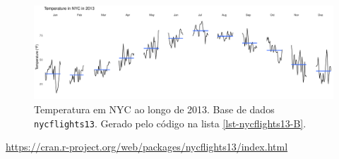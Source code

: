 \begin{frame}
\begin{figure}[h]
 \centering
  \includegraphics[width=\textwidth,height=0.7\textheight,keepaspectratio]{figures/nycflights13-B.pdf}
 \caption{Temperatura em NYC ao longo de 2013. Base de dados \texttt{nycflights13}. Gerado pelo código na lista \ref{lst-nycflights13-B}.}
 \label{fig-nycflights13-B}
\end{figure}

\url{https://cran.r-project.org/web/packages/nycflights13/index.html}

\end{frame}


